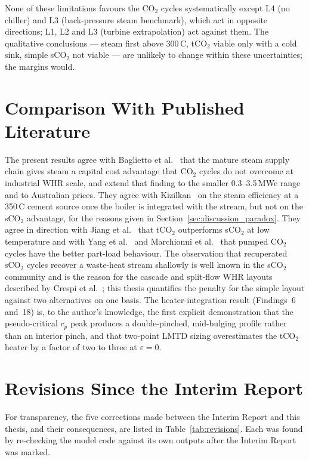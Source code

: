 \documentclass[12pt,a4paper]{report}
\begin{document}
None of these limitations favours the CO$_2$ cycles systematically except
L4 (no chiller) and L3 (back-pressure steam benchmark), which act in opposite
directions; L1, L2 and L3 (turbine extrapolation) act against them. The
qualitative conclusions --- steam first above 300\,\textdegree C, tCO$_2$
viable only with a cold sink, simple sCO$_2$ not viable --- are unlikely to
change within these uncertainties; the margins would.

\section{Comparison With Published Literature}
\label{sec:discussion_comparison}

The present results agree with Baglietto et al.~\cite{Baglietto2023} that the
mature steam supply chain gives steam a capital cost advantage that CO$_2$
cycles do not overcome at industrial WHR scale, and extend that finding to
the smaller 0.3--3.5\,MWe range and to Australian prices. They agree with
Kizilkan~\cite{Kizilkan2020} on the steam efficiency at a 350\,\textdegree C
cement source once the boiler is integrated with the stream, but not on the
sCO$_2$ advantage, for the reasons given in
Section~\ref{sec:discussion_paradox}. They agree in direction with Jiang et
al.~\cite{Jiang2023} that tCO$_2$ outperforms sCO$_2$ at low temperature and
with Yang et al.~\cite{Yang2024} and Marchionni et al.~\cite{Marchionni2020}
that pumped CO$_2$ cycles have the better part-load behaviour. The
observation that recuperated sCO$_2$ cycles recover a waste-heat stream
shallowly is well known in the sCO$_2$ community and is the reason for the
cascade and split-flow WHR layouts described by Crespi et
al.~\cite{Crespi2017}; this thesis quantifies the penalty for the simple
layout against two alternatives on one basis. The heater-integration result
(Findings~6 and~18) is, to the author's knowledge, the first explicit
demonstration that the pseudo-critical $c_p$ peak produces a double-pinched,
mid-bulging profile rather than an interior pinch, and that two-point LMTD
sizing overestimates the tCO$_2$ heater by a factor of two to three at
$\varepsilon = 0$.

\section{Revisions Since the Interim Report}
\label{sec:discussion_revisions}

For transparency, the five corrections made between the Interim Report and
this thesis, and their consequences, are listed in
Table~\ref{tab:revisions}. Each was found by re-checking the model code
against its own outputs after the Interim Report was marked.
\end{document}
